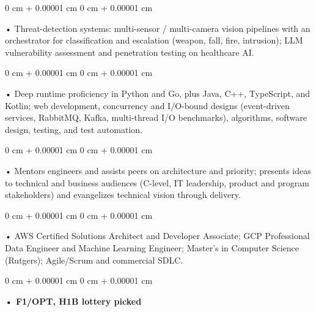 \documentclass[10pt, letterpaper]{article}
\newenvironment{onecolentry}{
    \begin{adjustwidth}{
        0 cm + 0.00001 cm
    }{
        0 cm + 0.00001 cm
    }
}{
    \end{adjustwidth}
} %
\begin{document}
        \begin{onecolentry}
            • Threat-detection systems: multi-sensor / multi-camera vision pipelines with an orchestrator for classification and escalation (weapon, fall, fire, intrusion); LLM vulnerability assessment and penetration testing on healthcare AI.
        \end{onecolentry}
        \begin{onecolentry}
            • Deep runtime proficiency in Python and Go, plus Java, C++, TypeScript, and Kotlin; web development, concurrency and I/O-bound designs (event-driven services, RabbitMQ, Kafka, multi-thread I/O benchmarks), algorithms, software design, testing, and test automation.
        \end{onecolentry}
        \begin{onecolentry}
            • Mentors engineers and assists peers on architecture and priority; presents ideas to technical and business audiences (C-level, IT leadership, product and program stakeholders) and evangelizes technical vision through delivery.
        \end{onecolentry}
        \begin{onecolentry}
            • AWS Certified Solutions Architect and Developer Associate; GCP Professional Data Engineer and Machine Learning Engineer; Master's in Computer Science (Rutgers); Agile/Scrum and commercial SDLC.
        \end{onecolentry}
        \begin{onecolentry}
                \textbf{• F1/OPT, H1B lottery picked}
        \end{onecolentry}

    \vspace{2 pt }
\end{document}
